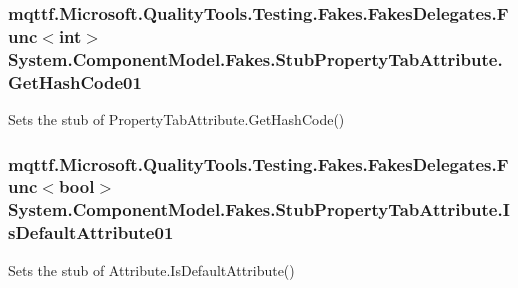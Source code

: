 \hypertarget{class_system_1_1_component_model_1_1_fakes_1_1_stub_property_tab_attribute_a323bfcb923242f9cefb21ae3108eddee}{
\subsubsection[{Get\-Hash\-Code01}]{\setlength{\rightskip}{0pt plus 5cm}mqttf.\-Microsoft.\-Quality\-Tools.\-Testing.\-Fakes.\-Fakes\-Delegates.\-Func$<$int$>$ System.\-Component\-Model.\-Fakes.\-Stub\-Property\-Tab\-Attribute.\-Get\-Hash\-Code01}}\label{class_system_1_1_component_model_1_1_fakes_1_1_stub_property_tab_attribute_a323bfcb923242f9cefb21ae3108eddee}


Sets the stub of Property\-Tab\-Attribute.\-Get\-Hash\-Code()

\hypertarget{class_system_1_1_component_model_1_1_fakes_1_1_stub_property_tab_attribute_abb0762db3e1ab8a1b05623d89812f43b}{
\subsubsection[{Is\-Default\-Attribute01}]{\setlength{\rightskip}{0pt plus 5cm}mqttf.\-Microsoft.\-Quality\-Tools.\-Testing.\-Fakes.\-Fakes\-Delegates.\-Func$<$bool$>$ System.\-Component\-Model.\-Fakes.\-Stub\-Property\-Tab\-Attribute.\-Is\-Default\-Attribute01}}\label{class_system_1_1_component_model_1_1_fakes_1_1_stub_property_tab_attribute_abb0762db3e1ab8a1b05623d89812f43b}


Sets the stub of Attribute.\-Is\-Default\-Attribute()

